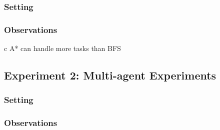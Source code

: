 \documentclass[11pt]{article}
\begin{document}
\subsubsection{Setting}

\subsubsection{Observations}
c
A* can handle more tasks than BFS


\subsection{Experiment 2: Multi-agent Experiments}

\subsubsection{Setting}

\subsubsection{Observations}
\end{document}
